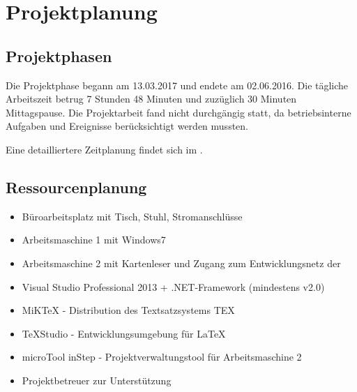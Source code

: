 
\clearpage
\section{Projektplanung} 
\label{sec:Projektplanung}


\subsection{Projektphasen}
\label{sec:Projektphasen}

Die Projektphase begann am 13.03.2017 und endete am 02.06.2016.
Die tägliche Arbeitszeit betrug 7 Stunden 48 Minuten und zuzüglich 30 Minuten Mittagspause.
Die Projektarbeit fand nicht durchgängig statt, da betriebsinterne Aufgaben und Ereignisse berücksichtigt werden mussten.


Eine detailliertere Zeitplanung findet sich im .

%

\subsection{Ressourcenplanung}
\label{sec:Ressourcenplanung}

\begin{itemize}
\renewcommand{\labelitemi}{}
\renewcommand{\labelitemii}{\textbullet}
\renewcommand{\labelitemiii}{\normalfont\bfseries\textendash}
		\begin{itemize}
			\item Büroarbeitsplatz mit Tisch, Stuhl, Stromanschlüsse
			\item Arbeitsmaschine 1 mit Windows7
			\item Arbeitsmaschine 2 mit Kartenleser und Zugang zum Entwicklungsnetz der \DRV
		\end{itemize}
\clearpage
		\begin{itemize}
			\item Visual Studio Professional 2013 + .NET-Framework (mindestens v2.0)
			\item MiKTeX - Distribution des Textsatzsystems TEX
			\item TeXStudio - Entwicklungsumgebung für \LaTeX
			\item microTool inStep - Projektverwaltungstool für Arbeitsmaschine 2
		\end{itemize}
		\begin{itemize}
			\item Projektbetreuer zur Unterstützung
		\end{itemize}
\end{itemize}

